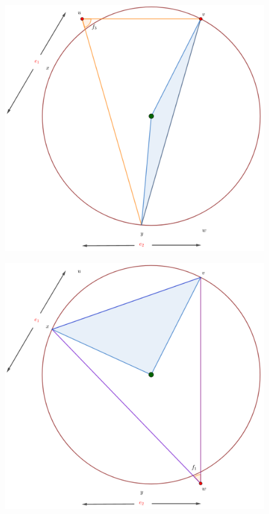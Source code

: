 {\begin{frame}
  \begin{figure}
    \centering
    \includegraphics[width=.65 \paperwidth]{./images/Bosquejo8.png}
  \end{figure}
\end{frame} 

\begin{frame}
  \begin{figure}
    \centering
    \includegraphics[width=.65 \paperwidth]{./images/Bosquejo9.png}
  \end{figure}
\end{frame} 

}
